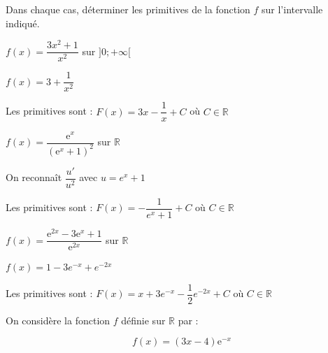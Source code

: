 \documentclass[11pt,a4paper]{article}  %
\begin{document}
\vspace*{-0.5cm}
\exerciceDS{}

Dans chaque cas, déterminer les primitives de la fonction $f$ sur l'intervalle indiqué.
	\begin{enumMet}
	\item $f(x)=\dfrac{3 x^2+1}{x^2}$ sur $] 0 ;+\infty[$
	\begin{corrBox}
		$f(x) = 3 + \dfrac{1}{x^2}$
			
		Les primitives sont : $F(x) = 3x - \dfrac{1}{x} + C$ où $C \in \mathbb{R}$
	\end{corrBox}
	\item $f(x)=\dfrac{\mathrm{e}^x}{\left(\mathrm{e}^x+1\right)^2}$ sur $\mathbb{R}$
	\begin{corrBox}
		On reconnaît $\dfrac{u'}{u^2}$ avec $u = e^x + 1$
		
		Les primitives sont : $F(x) = -\dfrac{1}{e^x+1} + C$ où $C \in \mathbb{R}$
	\end{corrBox}
	\item $f(x)=\dfrac{\mathrm{e}^{2 x}-3 \mathrm{e}^x+1}{\mathrm{e}^{2 x}}$ sur $\mathbb{R}$
	\begin{corrBox}
		$f(x) = 1 - 3e^{-x} + e^{-2x}$
			
		Les primitives sont : $F(x) = x + 3e^{-x} - \dfrac{1}{2}e^{-2x} + C$ où $C \in \mathbb{R}$
	\end{corrBox}
\end{enumMet}

\vspace*{-0.5cm}
\exerciceDS{}

On considère la fonction $f$ définie sur $\mathbb{R}$ par :

$$
f(x)=(3 x-4) \mathrm{e}^{-x}
$$
\end{document}
